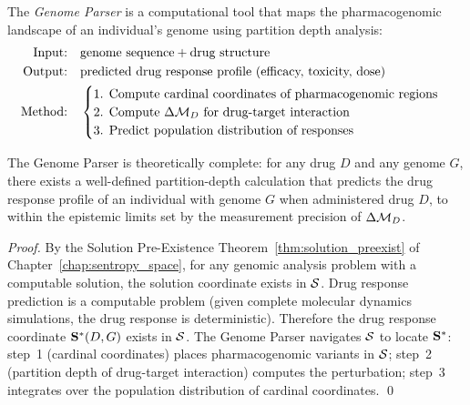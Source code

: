 \begin{definition}
\label{def:genome_parser}
The \emph{Genome Parser} is a computational tool that maps the
pharmacogenomic landscape of an individual's genome using partition depth
analysis:
\begin{align}
  \text{Input:} &\quad \text{genome sequence} + \text{drug structure} \\
  \text{Output:} &\quad \text{predicted drug response profile}
                          \text{ (efficacy, toxicity, dose)} \\
  \text{Method:} &\quad
  \begin{cases}
    \text{1. Compute cardinal coordinates of pharmacogenomic regions} \\
    \text{2. Compute } \Delta\mathcal{M}_D \text{ for drug-target interaction} \\
    \text{3. Predict population distribution of responses}
  \end{cases}
\end{align}
\end{definition}

\begin{proposition}
\label{prop:parser_completeness}
The Genome Parser is theoretically complete: for any drug $D$ and any genome
$G$, there exists a well-defined partition-depth calculation that predicts
the drug response profile of an individual with genome $G$ when administered
drug $D$, to within the epistemic limits set by the measurement precision of
$\Delta\mathcal{M}_D$.
\end{proposition}

\begin{proof}
By the Solution Pre-Existence Theorem~\ref{thm:solution_preexist} of
Chapter~\ref{chap:sentropy_space}, for any genomic analysis problem with a
computable solution, the solution coordinate exists in $\mathcal{S}$. Drug response
prediction is a computable problem (given complete molecular dynamics
simulations, the drug response is deterministic). Therefore the drug response
coordinate $\mathbf{S}^*(D, G)$ exists in $\mathcal{S}$. The Genome Parser navigates
$\mathcal{S}$ to locate $\mathbf{S}^*$: step~1 (cardinal coordinates) places
pharmacogenomic variants in $\mathcal{S}$; step~2 (partition depth of drug-target
interaction) computes the perturbation; step~3 integrates over the
population distribution of cardinal coordinates. \qed
\end{proof}

